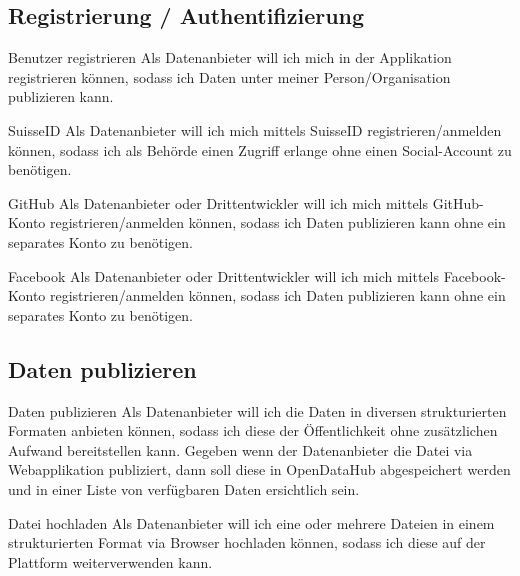 \subsection{Registrierung / Authentifizierung}

\begin{scrumepic}[label=epic:pd:registrieren]{Benutzer registrieren}
	Als Datenanbieter will ich mich in der Applikation registrieren können, sodass ich Daten unter meiner Person/Organisation publizieren kann.
\end{scrumepic}

\xxx
\begin{scrumstory}[label=story:pd:suisseid]{SuisseID}
	Als Datenanbieter will ich mich mittels SuisseID registrieren/anmelden können, sodass ich als Behörde einen Zugriff erlange ohne einen Social-Account zu benötigen.
\end{scrumstory}

\begin{scrumstory}[label=story:pd:github]{GitHub}
	Als Datenanbieter oder Drittentwickler will ich mich mittels GitHub-Konto registrieren/anmelden können, sodass ich Daten publizieren kann ohne ein separates Konto zu benötigen.
\end{scrumstory}

\begin{scrumstory}[label=story:pd:facebook]{Facebook}
	Als Datenanbieter oder Drittentwickler will ich mich mittels Facebook-Konto registrieren/anmelden können, sodass ich Daten publizieren kann ohne ein separates Konto zu benötigen.
\end{scrumstory}


\subsection{Daten publizieren}

\begin{scrumepic}[label=epic:pd:publizieren]{Daten publizieren}
	Als Datenanbieter will ich die Daten in diversen strukturierten Formaten anbieten können, sodass ich diese der Öffentlichkeit ohne zusätzlichen Aufwand bereitstellen kann.
	\storyacceptance	
	Gegeben
	wenn der Datenanbieter die Datei via Webapplikation publiziert, dann soll diese in OpenDataHub abgespeichert werden und in einer Liste von verfügbaren Daten ersichtlich sein.
\end{scrumepic}

\begin{scrumstory}[label=story:pd:hochladen]{Datei hochladen}
	Als Datenanbieter will ich eine oder mehrere Dateien in einem strukturierten Format via Browser hochladen können, sodass ich diese auf der Plattform weiterverwenden kann.
\end{scrumstory}

